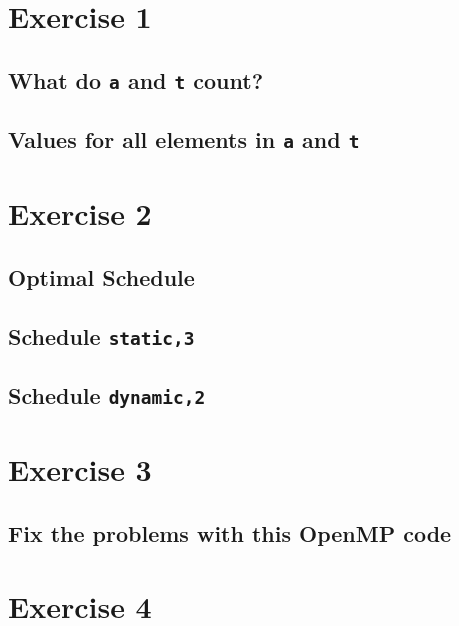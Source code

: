 \documentclass[a4paper,%
11pt,%
DIV12,
headsepline,%
headings=normal,
]{scrartcl}
\begin{document}
\maketitlepage




\section{Exercise 1}

\subsection{What do \texttt{a} and \texttt{t} count?}

\subsection{Values for all elements in \texttt{a} and \texttt{t}}

\section{Exercise 2}

\subsection{Optimal Schedule}

\subsection{Schedule \texttt{static,3}}

\subsection{Schedule \texttt{dynamic,2}}

\section{Exercise 3}

\subsection{Fix the problems with this OpenMP code}

\section{Exercise 4}
\end{document}
